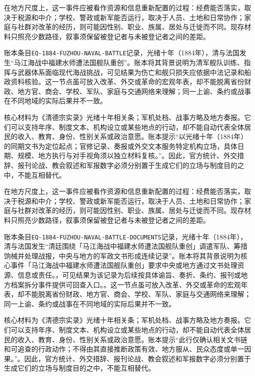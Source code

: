 在地方尺度上，这一事件应被看作资源和信息重新配置的过程：经费能否落实，取决于税源和中介；学校、警政或新军能否运行，取决于人员、土地和日常协作；家庭与社群对改革的经历，则可能因性别、职业、族属、居处与迁徙而不同。现存材料只照亮少数路径，叙事须保留被登记者与未被登记者之间的差距。

账本条目\texttt{EQ-1884-FUZHOU-NAVAL-BATTLE}记录，光绪十年（1884年），清与法国发生“马江海战中福建水师遭法国舰队重创”。账本将其背景说明为清军舰队训练、指挥与武器体系面临现代海战挑战，可见结果为伤亡和舰只损失应依据中法记录和船政资料核验。这一节点虽可放入改革、外交或革命的宏观年表，却不能脱离省份财政、地方官、商会、学校、军队、家庭与交通网络来理解；同一上谕、条约或战事在不同地域的实际后果并不一致。

核心材料为《清德宗实录》光绪十年相关条；军机处档、战事方略及地方奏报。它们可以支持年序、制度文本、机构设立或某些地点的行动，却不能自动代表全体居民的收入、教育、身份、性别关系或政治意愿。账本提示“以光绪十年（1884年）的同期文书为定位起点；官修记录、奏报或外交文本服务特定机构立场，具体日期、规模、地方执行与对手视角须以独立材料复核。”。因此，官方统计、外交措辞、报刊论战、教会叙述和军报数字必须分别置于生成它们的立场与制度目的之中，不能互相替代。

在地方尺度上，这一事件应被看作资源和信息重新配置的过程：经费能否落实，取决于税源和中介；学校、警政或新军能否运行，取决于人员、土地和日常协作；家庭与社群对改革的经历，则可能因性别、职业、族属、居处与迁徙而不同。现存材料只照亮少数路径，叙事须保留被登记者与未被登记者之间的差距。

账本条目\texttt{EQ-1884-FUZHOU-NAVAL-BATTLE-DOCUMENTS}记录，光绪十年（1884年），清与法国发生“清廷围绕「马江海战中福建水师遭法国舰队重创」调遣军队、筹措饷械并处理战报，中央与地方的军政文书形成连续记录”。账本将其背景说明为核心事件「马江海战中福建水师遭法国舰队重创」要求中央或地方通过文书处理资源、信息或责任。，可见结果为该记录为后续按具体谕旨、奏折、条约、报刊或地方档案拆分事件提供可回查入口。。这一节点虽可放入改革、外交或革命的宏观年表，却不能脱离省份财政、地方官、商会、学校、军队、家庭与交通网络来理解；同一上谕、条约或战事在不同地域的实际后果并不一致。

核心材料为《清德宗实录》光绪十年相关条；军机处档、战事方略及地方奏报。它们可以支持年序、制度文本、机构设立或某些地点的行动，却不能自动代表全体居民的收入、教育、身份、性别关系或政治意愿。账本提示“此行仅确认相关文书链和可追查的行政动作；不得由其直接推断政策有效、地方服从、民众态度或单一因果。”。因此，官方统计、外交措辞、报刊论战、教会叙述和军报数字必须分别置于生成它们的立场与制度目的之中，不能互相替代。

